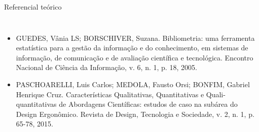 
\begin{frame}[t]{Referencial teórico} 
    \transdissolve[duration=0.5]
        \begin{columns}[t]
                \begin{itemize}
                    \item GUEDES, Vânia LS; BORSCHIVER, Suzana. Bibliometria: uma ferramenta estatística para a gestão da informação e do conhecimento, em sistemas de informação, de comunicação e de avaliação científica e tecnológica. Encontro Nacional de Ciência da Informação, v. 6, n. 1, p. 18, 2005.
                    \item PASCHOARELLI, Luis Carlos; MEDOLA, Fausto Orsi; BONFIM, Gabriel Henrique Cruz. Características Qualitativas, Quantitativas e Quali-quantitativas de Abordagens Científicas: estudos de caso na subárea do Design Ergonômico. Revista de Design, Tecnologia e Sociedade, v. 2, n. 1, p. 65-78, 2015.
                \end{itemize}
        \end{columns}
\end{frame}
